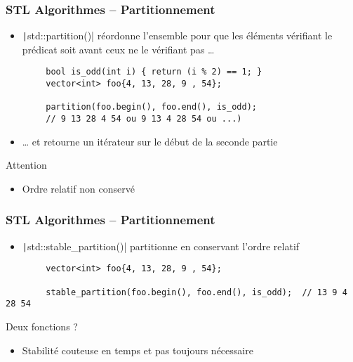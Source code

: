 \documentclass[C++.tex]{subfiles}
\begin{document}
\begin{frame}[fragile]
	\frametitle{STL Algorithmes -- Partitionnement}
	\begin{itemize}
		\item \texttt|std::partition()| réordonne l'ensemble pour que les éléments vérifiant le prédicat soit avant ceux ne le vérifiant pas \ldots{}
	\end{itemize}

	\begin{verbatim}
		bool is_odd(int i) { return (i % 2) == 1; }
		vector<int> foo{4, 13, 28, 9 , 54};

		partition(foo.begin(), foo.end(), is_odd);
		// 9 13 28 4 54 ou 9 13 4 28 54 ou ...)
	\end{verbatim}

	\begin{itemize}
		\item \ldots{} et retourne un itérateur sur le début de la seconde partie
	\end{itemize}

	\begin{alertblock}{Attention}
		\begin{itemize}
			\item Ordre relatif non conservé
		\end{itemize}
	\end{alertblock}
\end{frame}

\begin{frame}[fragile]
	\frametitle{STL Algorithmes -- Partitionnement}
	\begin{itemize}
		\item \texttt|std::stable_partition()| partitionne en conservant l'ordre relatif
	\end{itemize}

	\begin{verbatim}
		vector<int> foo{4, 13, 28, 9 , 54};

		stable_partition(foo.begin(), foo.end(), is_odd);  // 13 9 4 28 54
	\end{verbatim}

	\begin{block}{Deux fonctions ?}
		\begin{itemize}
			\item Stabilité couteuse en temps et pas toujours nécessaire
		\end{itemize}
	\end{block}
\end{frame}
\end{document}
